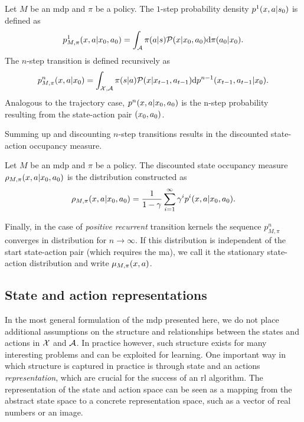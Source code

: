 \begin{definition}
    Let $M$ be an \ac{mdp} and $\pi$ be a policy.
    The $1$-step probability density $p^1(x,a|s_0)$ is defined as $$p^1_{M, \pi}(x,a|x_0,a_0) = \int_{\mathcal{A}} \pi(a|s) \mathcal{P}(x|x_0,a_0) \mathrm{d} \pi(a_0|x_0).$$ 
    The $n$-step transition is defined recursively as $$p^n_{M, \pi}(x,a|x_0) = \int_{\mathcal{X},\mathcal{A}} \pi(s|a) \mathcal{P}(x|x_{t-1},a_{t-1}) \mathrm{d} p^{n-1}(x_{t-1},a_{t-1}|x_0) .$$
    Analogous to the trajectory case, $p^n(x,a|x_0,a_0)$ is the n-step probability resulting from the state-action pair $(x_0,a_0)$.
\end{definition}

Summing up and discounting $n$-step transitions results in the discounted state-action occupancy measure.

\begin{definition}
    Let $M$ be an \ac{mdp} and $\pi$ be a policy.
    The discounted state occupancy measure $\rho_{M,\pi}(x,a|x_0,a_0)$ is the distribution constructed as $$\rho_{M,\pi}(x,a|x_0,a_0) = \frac{1}{1 - \gamma} \sum_{i=1}^\infty \gamma^i p^i(x,a|x_0,a_0).$$
\end{definition}

Finally, in the case of \emph{positive recurrent} transition kernels the sequence $p^n_{M,\pi}$ converges in distribution for $n \rightarrow \infty$.
If this distribution is independent of the start state-action pair (which requires the ma), we call it the stationary state-action distribution and write $\mu_{M,\pi}(x,a)$.

\subsection{State and action representations}

In the most general formulation of the \ac{mdp} presented here, we do not place additional assumptions on the structure and relationships between the states and actions in $\mathcal{X}$ and $\mathcal{A}$.
In practice however, such structure exists for many interesting problems and can be exploited for learning.
One important way in which structure is captured in practice is through state and an actions \emph{representation}, which are crucial for the success of an \ac{rl} algorithm.
The representation of the state and action space can be seen as a mapping from the abstract state space to a concrete representation space, such as a vector of real numbers or an image.

